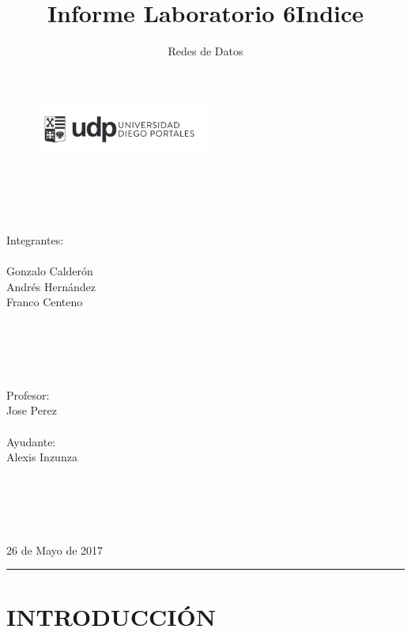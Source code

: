 \documentclass[onecolumn,12pt]{IEEEtran}
\begin{document}
\title{Informe Laboratorio 6}
\author{Redes de Datos}

\begin{figure}[h]
\includegraphics[width=0.50\textwidth]{logo_udp.png}
\label{fig:mesh1}
\\
\\
\\
\\
\\
\maketitle
\end{figure}
\begin{center}
Integrantes:\\
\hfill \\
Gonzalo Calderón\\
Andrés Hernández\\
Franco Centeno\\
\hfill \\
\hfill \\
\hfill \\
\hfill \\
\ \hfill \\
Profesor:\\
Jose Perez\\ \hfill \\
Ayudante:\\
Alexis Inzunza\\
\hfill \\
\hfill \\
\hfill \\
\hfill \\
\hfill \\
26 de Mayo de 2017
\end{center}

\newpage
\title{Indice}
\author{ }
\maketitle
\hrule
\tableofcontents

\newpage
\section{INTRODUCCIÓN}
\hfill \\
\end{document}
